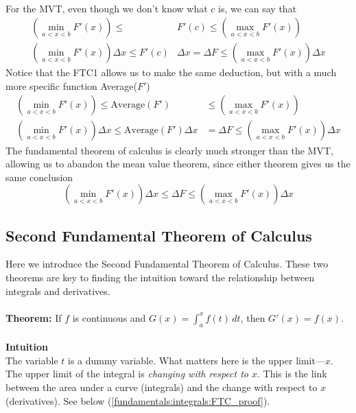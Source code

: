 \documentclass{report}
\begin{document}
\vspace{1mm}\\
For the MVT, even though we don't know what $c$ is, we can say that
\begin{align*}
\left(\min_{a<x<b}F'(x)\right)\leq&F'(c)
\leq\left(\max_{a<x<b}F'(x)\right)\\
\left(\min_{a<x<b}F'(x)\right)\Delta x\leq F'(c)&\Delta x
=\Delta F\leq\left(\max_{a<x<b}F'(x)\right)\Delta x
\end{align*}
Notice that the FTC1 allows us to make the same deduction, but with a much more
specific function Average($F'$)
\begin{align*}
\left(\min_{a<x<b}F'(x)\right)\leq\text{Average}(F')&
\leq\left(\max_{a<x<b}F'(x)\right)\\
\left(\min_{a<x<b}F'(x)\right)\Delta x\leq\text{Average}(F')\Delta x&
=\Delta F\leq\left(\max_{a<x<b}F'(x)\right)\Delta x
\end{align*}
The fundamental theorem of calculus is clearly much stronger than the MVT, allowing us
to abandon the mean value theorem, since either theorem gives us the same conclusion
\begin{equation*}
\left(\min_{a<x<b}F'(x)\right)\Delta x\leq
\Delta F\leq\left(\max_{a<x<b}F'(x)\right)\Delta x
\end{equation*}
\newpage

\subsection{Second Fundamental Theorem of Calculus} %
Here we introduce the Second Fundamental Theorem of Calculus. These two theorems are 
key to finding the intuition toward the relationship between integrals and derivatives.\\
\vspace{1mm}\\
\textbf{Theorem:} If $f$ is continuous and 
$G(x)=\int_{a}^xf(t)\,dt$, then $G'(x)=f(x)$.\\
\vspace{1mm}\\
\textbf{Intuition}\\
The variable $t$ is a dummy variable. What matters here is the upper limit---$x$.
The upper limit of the integral is \textit{changing with respect to $x$}.
This is the link between the area under a curve (integrals) and the change with
respect to $x$ (derivatives). See below (\ref{fundamentals:integrals:FTC_proof}).
\end{document}
